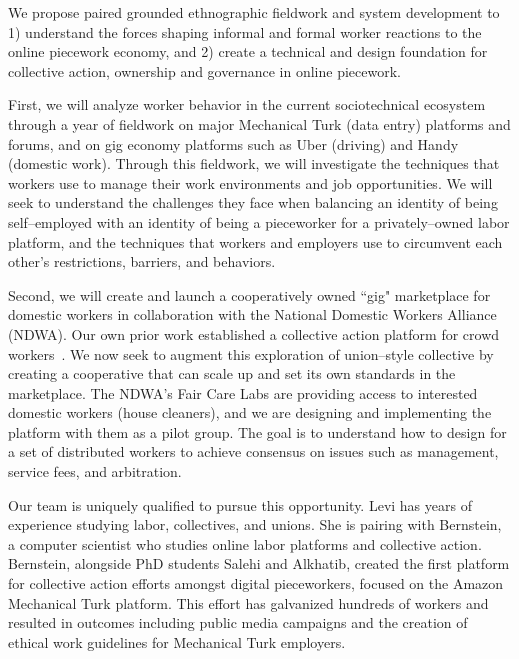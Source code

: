 \documentclass{article}
\begin{document}
We propose paired grounded ethnographic fieldwork and system development to 1) understand the forces shaping informal and formal worker reactions to the online piecework economy,
and 2) create a technical and design foundation for collective action,
ownership and governance in online piecework.


First, we will analyze worker behavior in the current sociotechnical ecosystem through a year of fieldwork on major Mechanical Turk
(data entry)
platforms and forums,
and on gig economy platforms such as Uber
(driving)
and Handy
(domestic work).
Through this fieldwork, we will investigate the techniques that workers use to manage their work environments and job opportunities.
We will seek to understand the challenges they face when balancing
an identity of being self--employed with an identity of being a pieceworker for a privately--owned labor platform, and
the techniques that workers and employers use to circumvent each other's restrictions, barriers, and behaviors.

Second, we will create and launch a cooperatively owned ``gig" marketplace for domestic workers in collaboration with the National Domestic Workers Alliance
(NDWA).
Our own prior work established a collective action platform for crowd workers~\cite{dynamo}.
We now seek to augment this exploration of union--style collective by creating a cooperative that can scale up and set its own standards in the marketplace.
The NDWA's Fair Care Labs are providing access to interested domestic workers
(house cleaners), and we are designing and implementing the platform with them as a pilot group.
The goal is to understand how to design for a set of distributed workers to achieve consensus on issues such as management, service fees, and arbitration.

Our team is uniquely qualified to pursue this opportunity.
Levi has years of experience studying labor, collectives, and unions.
She is pairing with Bernstein, a computer scientist who studies online labor platforms and collective action.
Bernstein, alongside PhD students Salehi and Alkhatib, created the first platform for collective action efforts amongst digital pieceworkers, focused on the Amazon Mechanical Turk platform.
This effort has galvanized hundreds of workers and resulted in outcomes including public media campaigns and the creation of ethical work guidelines for Mechanical Turk employers.
\end{document}
